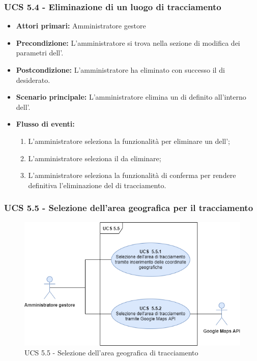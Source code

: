 \subsubsection{UCS 5.4 - Eliminazione di un luogo di tracciamento}%
\begin{itemize}
    \item \textbf{Attori primari:} Amministratore gestore
    \item \textbf{Precondizione:} L'amministratore si trova nella sezione di modifica dei parametri dell'.
    \item \textbf{Postcondizione:} L'amministratore ha eliminato con successo il  di  desiderato.
    \item \textbf{Scenario principale:} L'amministratore elimina un  di  definito all'interno dell'.
    \item \textbf{Flusso di eventi:}
    \begin{enumerate}%
        \item L'amministratore seleziona la funzionalità per eliminare un  dell';
        \item L'amministratore seleziona il  da eliminare;
        \item L'amministratore seleziona la funzionalità di conferma per rendere definitiva l'eliminazione del  di tracciamento.
    \end{enumerate}
\end{itemize}

\subsubsection{UCS 5.5 - Selezione dell'area geografica per il tracciamento}%

\begin{figure}[h!]
	\centering
    \includegraphics[scale=0.53]{Sezioni/UseCase/Immagini/UCS5.5.png}
    \caption{UCS 5.5 - Selezione dell'area geografica di tracciamento}
\end{figure}

